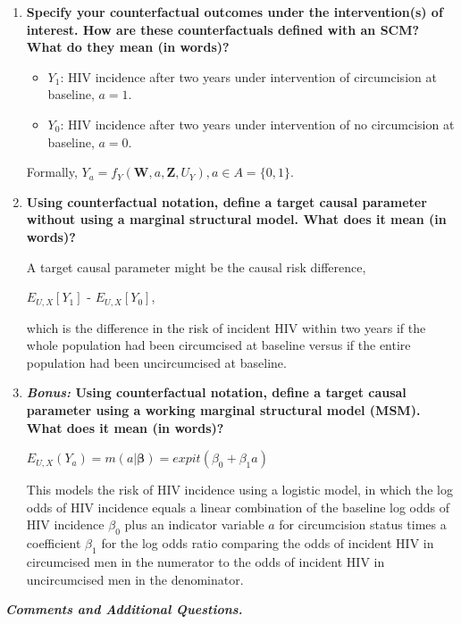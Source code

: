 \documentclass{article}
\begin{document}
\begin{enumerate}[label=\textbf{(\alph*)}]
  \item \textbf{Specify your counterfactual outcomes under the intervention(s) of interest. How are these counterfactuals defined with an SCM? What do they mean (in words)?}
  \begin{itemize}
  \item $Y_1$: HIV incidence after two years under intervention of circumcision at baseline, $a = 1$.
  \item $Y_0$: HIV incidence after two years under intervention of no circumcision at baseline, $a = 0$.
  \end{itemize}

  Formally, $Y_a = f_{Y}(\bm{W}, a, \bm{Z}, U_{Y}), a \in A = \{0, 1\}.$

  \item \textbf{Using counterfactual notation, define a target causal parameter without using a marginal structural model. What does it mean (in words)?}

  A target causal parameter might be the causal risk difference,

  $E_{U, X}[Y_1]$ - $E_{U, X}[Y_0]$,

  which is the difference in the risk of incident HIV within two years if the whole population had been circumcised at baseline versus if the entire population had been uncircumcised at baseline. 

  \item \textbf{\textit{Bonus:} Using counterfactual notation, define a target causal parameter using a working marginal structural model (MSM). What does it mean (in words)?}

  $E_{U, X}(Y_a) = m(a|\bm{\beta}) = expit(\beta_0 + \beta_1 a)$

  This models the risk of HIV incidence using a logistic model, in which the log odds of HIV incidence equals a linear combination of the baseline log odds of HIV incidence $\beta_0$ plus an indicator variable $a$ for circumcision status times a coefficient $\beta_1$ for the log odds ratio comparing the odds of incident HIV in circumcised men in the numerator to the odds of incident HIV in uncircumcised men in the denominator.
  
\end{enumerate}

\pagebreak

\textbf{\textit{Comments and Additional Questions.}}

\vspace{2mm}
\end{document}

